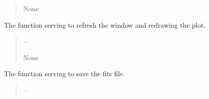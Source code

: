 \documentclass[letterpaper,11pt,english]{sphinxmanual}
\begin{document}
\begin{savenotes}
\begin{fulllineitems}
\begin{savenotes}
\begin{fulllineitems}
\begin{quote}
\begin{description}
\sphinxAtStartPar
None

\end{description}\end{quote}

\end{fulllineitems}\end{savenotes}


\begin{savenotes}\begin{fulllineitems}
\label{\detokenize{code/opihiexarata.gui.manual:opihiexarata.gui.manual.OpihiManualWindow.__connect_push_button_refresh_window}}
\pysigstartsignatures
{}
\pysigstopsignatures
\sphinxAtStartPar
The function serving to refresh the window and redrawing the plot.
\begin{quote}\begin{description}
\sphinxAtStartPar
{} – 

\sphinxAtStartPar
None

\end{description}\end{quote}

\end{fulllineitems}\end{savenotes}


\begin{savenotes}\begin{fulllineitems}
\label{\detokenize{code/opihiexarata.gui.manual:opihiexarata.gui.manual.OpihiManualWindow.__connect_push_button_summary_save}}
\pysigstartsignatures
{}
\pysigstopsignatures
\sphinxAtStartPar
The function serving to save the fits file.
\begin{quote}\begin{description}
\sphinxAtStartPar
{} – 


\end{description}
\end{quote}
\end{fulllineitems}
\end{savenotes}
\end{fulllineitems}
\end{savenotes}
\end{document}

